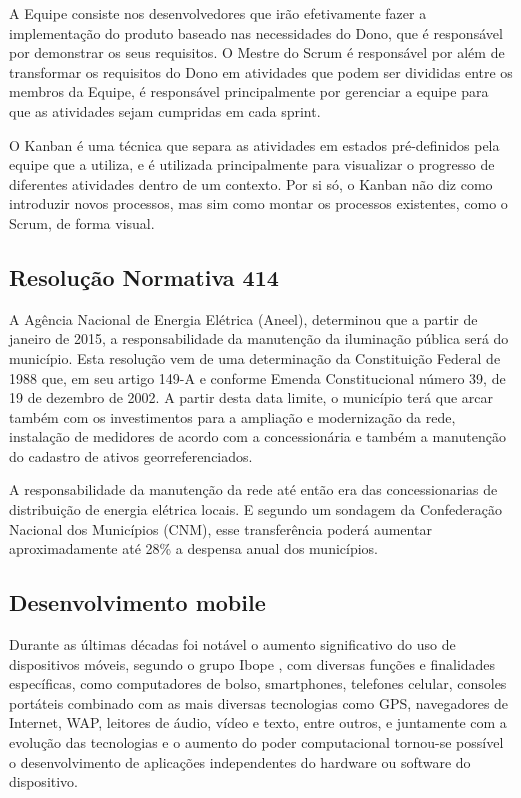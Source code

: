 \documentclass[
	article,			%
	11pt,				%
	oneside,			%
	a4paper,			%
	english,			%
	brazil,				%
	sumario=tradicional
	]{abntex2}
\begin{document}
A Equipe consiste nos desenvolvedores que irão efetivamente fazer a
implementação do produto baseado nas necessidades do Dono, que é responsável por
demonstrar os seus requisitos. O Mestre do Scrum é responsável por além de
transformar os requisitos do Dono em atividades que podem ser divididas entre os
membros da Equipe, é responsável principalmente por gerenciar a equipe para que
as atividades sejam cumpridas em cada sprint. \cite{scrum}

O Kanban é uma técnica que separa as atividades em estados pré-definidos pela
equipe que a utiliza, e é utilizada principalmente para visualizar o progresso
de diferentes atividades dentro de um contexto. Por si só, o Kanban não diz como
introduzir novos processos, mas sim como montar os processos existentes, como o
Scrum, de forma visual.

\subsection{Resolução Normativa 414}

A Agência Nacional de Energia Elétrica (Aneel), determinou que a partir de janeiro
de 2015, a responsabilidade da manutenção da iluminação pública será do município.
Esta resolução vem de uma determinação da Constituição Federal de 1988 que,
em seu artigo 149-A e conforme Emenda Constitucional número 39, de 19 de dezembro
de 2002. A partir desta data limite, o município terá que arcar também com os
investimentos para a ampliação e modernização da rede, instalação de medidores
de acordo com a concessionária e também a manutenção do cadastro de ativos
georreferenciados.

A responsabilidade da manutenção da rede até então era das concessionarias de
distribuição de energia elétrica locais. E segundo um sondagem da Confederação
Nacional dos Municípios (CNM), esse transferência poderá aumentar aproximadamente
até 28\% a despensa anual dos municípios.\cite{cdu}

\subsection{Desenvolvimento mobile}

Durante as últimas décadas foi notável o aumento significativo do uso de
dispositivos móveis, segundo o grupo Ibope \cite{ibope}, com diversas funções e finalidades
específicas, como computadores de bolso, smartphones, telefones celular,
consoles portáteis combinado com as mais diversas tecnologias como GPS,
navegadores de Internet, WAP, leitores de áudio, vídeo e texto, entre outros,
e juntamente com a evolução das tecnologias e o aumento do poder computacional
tornou-se possível o desenvolvimento de aplicações independentes do hardware ou
software do dispositivo.
\end{document}
